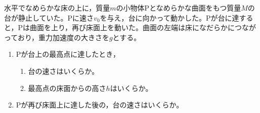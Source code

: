 \hakosyokika
\item
    \begin{mawarikomi}{180pt}{}
        水平でなめらかな床の上に，質量$m$の小物体Pとなめらかな曲面をもつ質量$M$の台が静止していた。Pに速さ$v_0$を与え，台に向かって動かした。Pが台に達すると，Pは曲面を上り，再び床面上を動いた。曲面の左端は床になだらかにつながっており，重力加速度の大きさを$g$とする。
        \begin{enumerate}
            \item Pが台上の最高点に達したとき，
            \begin{enumerate}
                \item 台の速さはいくらか。
                \item 最高点の床面からの高さ$h$はいくらか。
            \end{enumerate}
            \item Pが再び床面上に達した後の，台の速さはいくらか。
        \end{enumerate}
    \end{mawarikomi}